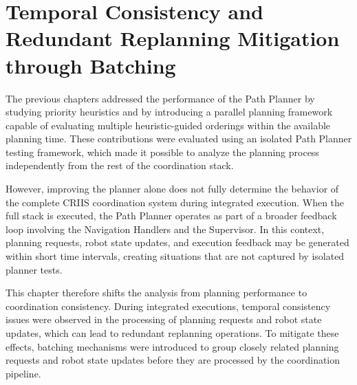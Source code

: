 \chapter{Temporal Consistency and Redundant Replanning Mitigation through Batching} 
\label{chap:temporal_consistency_batching}
\label{chap:ch9}
\hspace{\parindent}
The previous chapters addressed the performance of the Path Planner by studying priority
heuristics and by introducing a parallel planning framework capable of evaluating multiple
heuristic-guided orderings within the available planning time. These contributions were evaluated
using an isolated Path Planner testing framework, which made it possible to analyze the planning
process independently from the rest of the coordination stack.

However, improving the planner alone does not fully determine the behavior of the complete CRIIS
coordination system during integrated execution. When the full stack is executed, the Path Planner
operates as part of a broader feedback loop involving the Navigation Handlers and the Supervisor.
In this context, planning requests, robot state updates, and execution feedback may be generated
within short time intervals, creating situations that are not captured by isolated planner tests.

This chapter therefore shifts the analysis from planning performance to coordination consistency.
During integrated executions, temporal consistency issues were observed in the processing of
planning requests and robot state updates, which can lead to redundant replanning operations.
To mitigate these effects, batching mechanisms were introduced to group closely related planning
requests and robot state updates before they are processed by the coordination pipeline.


